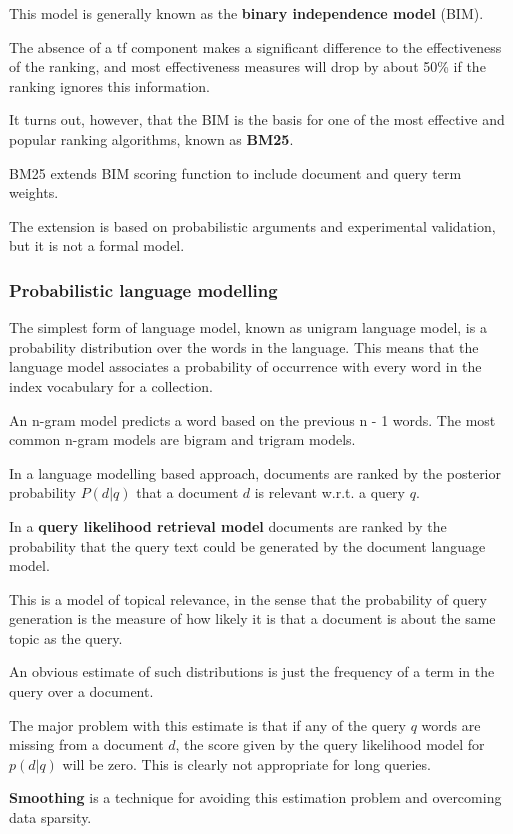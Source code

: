 This model is generally known as the \textbf{binary independence model} (BIM).

The absence of a tf component makes a significant difference to the effectiveness of the ranking, and most
effectiveness measures will drop by about 50\% if the ranking ignores this information.

It turns out, however, that the BIM is the basis for one of the most effective and popular ranking algorithms, known as \textbf{BM25}.

BM25 extends BIM scoring function to include document and query term weights.

The extension is based on probabilistic arguments and experimental validation, but it is not a formal model.

\subsubsection{Probabilistic language modelling}

The simplest form of language model, known as unigram language model, is a probability distribution over the words in the language. This means that the language model associates a probability of occurrence with every word in the index vocabulary for a collection.

An n-gram model predicts a word based on the previous n - 1 words. The most common n-gram models are bigram and trigram models.

In a language modelling based approach, documents are ranked by the posterior probability $P (d|q)$ that a document $d$ is relevant w.r.t. a query $q$.

In a \textbf{query likelihood retrieval model} documents are ranked by the probability that the query text could be generated by the document language model.

This is a model of topical relevance, in the sense that the probability of query generation is the measure of how likely it is that a document is about the same topic as the query.

An obvious estimate of such distributions is just the frequency of a term in the query over a document.

The major problem with this estimate is that if any of the query $q$ words are missing from a document $d$, the score given by the query likelihood model for $p (d|q)$ will be zero. This is clearly not appropriate for long queries.

\textbf{Smoothing} is a technique for avoiding this estimation problem and overcoming data sparsity.

